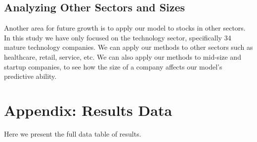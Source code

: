 \documentclass[pageno]{jpaper}
\begin{document}
\subsection{Analyzing Other Sectors and Sizes}
Another area for future growth is to apply our model to stocks in other sectors. In this study we have only focused on the technology sector, specifically 34 mature technology companies. We can apply our methods to other sectors such as healthcare, retail, service, etc. We can also apply our methods to mid-size and startup companies, to see how the size of a company affects our model’s predictive ability. 

\newpage
\section*{Appendix: Results Data}
\label{app: appendix}
Here we present the full data table of results.
\end{document}
